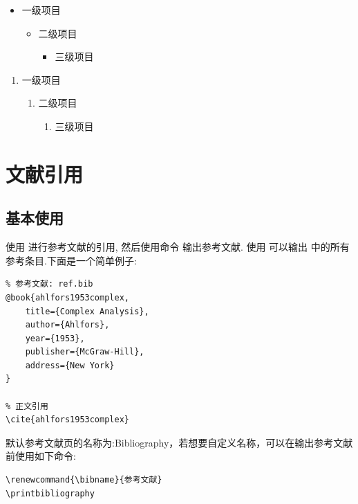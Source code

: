 \begin{multicols}{2}
    \begin{itemize}
        \item 一级项目
        \begin{itemize}
            \item 二级项目
            \begin{itemize}
                \item 三级项目
            \end{itemize}
        \end{itemize}
    \end{itemize}
    
    \begin{enumerate}
        \item 一级项目
        \begin{enumerate}
            \item 二级项目
            \begin{enumerate}
                \item 三级项目
            \end{enumerate}
        \end{enumerate}
    \end{enumerate}
\end{multicols}


\section{文献引用}
\subsection{基本使用}
使用  进行参考文献的引用, 然后使用命令 \cmd{\printbibliography} 输出参考文献.
使用\cmd{\nocite{*}} 可以输出  中的所有参考条目.下面是一个简单例子:

\begin{verbatim}
% 参考文献: ref.bib
@book{ahlfors1953complex,
    title={Complex Analysis},
    author={Ahlfors},
    year={1953},
    publisher={McGraw-Hill},
    address={New York}
}

% 正文引用
\cite{ahlfors1953complex}
\end{verbatim}

默认参考文献页的名称为:Bibliography，若想要自定义名称，可以在输出参考文献前使用如下命令:
\begin{verbatim}
\renewcommand{\bibname}{参考文献}
\printbibliography
\end{verbatim}

